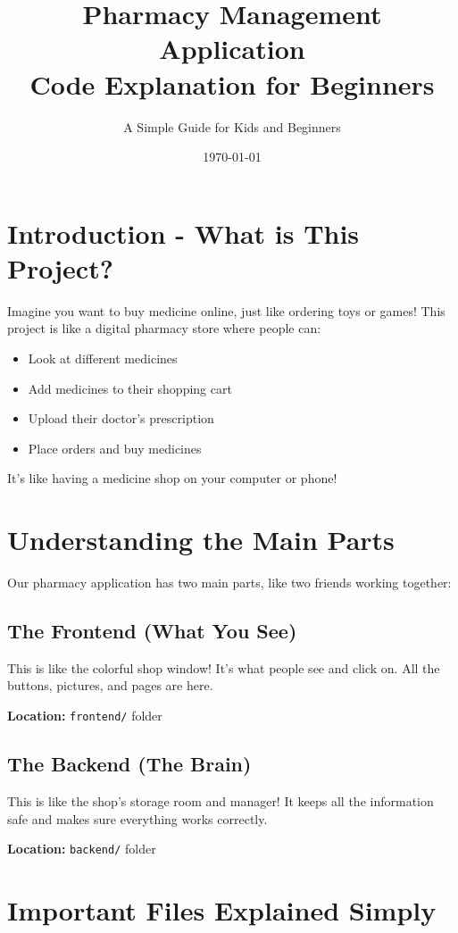 \documentclass[12pt]{article}
\title{\textbf{Pharmacy Management Application} \\ Code Explanation for Beginners}
\author{A Simple Guide for Kids and Beginners}
\date{\today}
\begin{document}
\maketitle
\newpage

\tableofcontents
\newpage

\section{Introduction - What is This Project?}

Imagine you want to buy medicine online, just like ordering toys or games! This project is like a digital pharmacy store where people can:
\begin{itemize}
    \item Look at different medicines
    \item Add medicines to their shopping cart
    \item Upload their doctor's prescription
    \item Place orders and buy medicines
\end{itemize}

It's like having a medicine shop on your computer or phone!

\section{Understanding the Main Parts}

Our pharmacy application has two main parts, like two friends working together:

\subsection{The Frontend (What You See) 👀}
This is like the colorful shop window! It's what people see and click on. All the buttons, pictures, and pages are here.

\textbf{Location:} \texttt{frontend/} folder

\subsection{The Backend (The Brain) 🧠}
This is like the shop's storage room and manager! It keeps all the information safe and makes sure everything works correctly.

\textbf{Location:} \texttt{backend/} folder

\section{Important Files Explained Simply}
\end{document}
